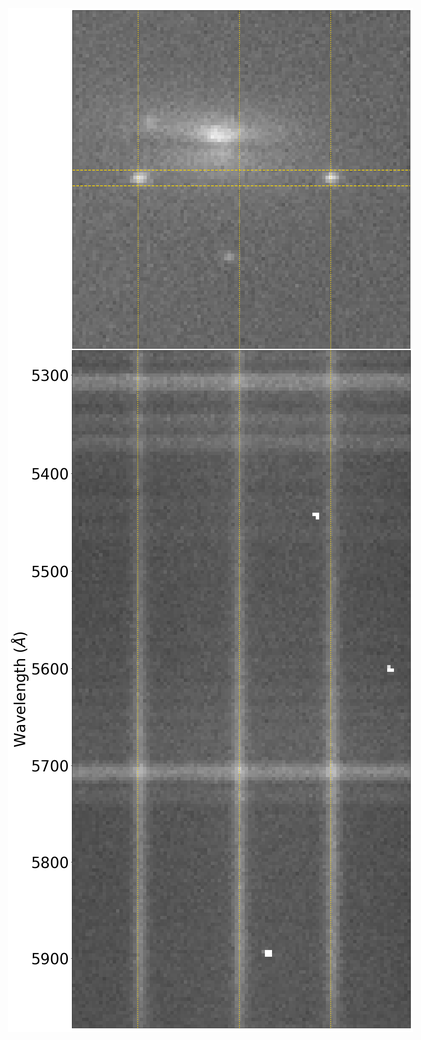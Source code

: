 \documentclass[a4paper,oneside,12pt, class=Latex/Classes/PhDthesisPSnPDF, crop=false]{standalone}
\begin{document}
\begin{figure}
    \centering
    \includegraphics[height=0.83\textheight]{../Images/chapter_2/phot_and_spec_example.png}

\end{figure}
\end{document}
